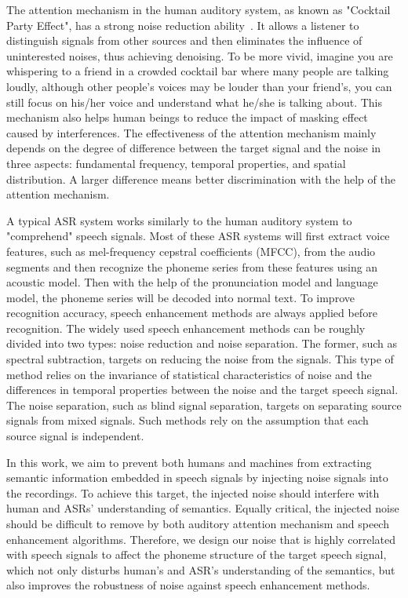 The attention mechanism in the human auditory system, as known as "Cocktail Party Effect", has a strong noise reduction ability~\cite{festen_effects_1990, leek_informational_1991,brungart_informational_2001, mattys_effects_2010}. It allows a listener to distinguish signals from other sources and then eliminates the influence of uninterested noises, thus achieving denoising. To be more vivid, imagine you are whispering to a friend in a crowded cocktail bar where many people are talking loudly, although other people's voices may be louder than your friend's, you can still focus on his/her voice and understand what he/she is talking about. This mechanism also helps human beings to reduce the impact of masking effect caused by interferences. The effectiveness of the attention mechanism mainly depends on the degree of difference between the target signal and the noise in three aspects: fundamental frequency, temporal properties, and spatial distribution. A larger difference means better discrimination with the help of the attention mechanism.

A typical ASR system works similarly to the human auditory system to "comprehend" speech signals. Most of these ASR systems will first extract voice features, such as mel-frequency cepstral coefficients (MFCC), from the audio segments and then recognize the phoneme series from these features using an acoustic model. Then with the help of the pronunciation model and language model, the phoneme series will be decoded into normal text. To improve recognition accuracy, speech enhancement methods are always applied before recognition. 
The widely used speech enhancement methods can be roughly divided into two types: noise reduction and noise separation. The former, such as spectral subtraction, targets on reducing the noise from the signals. This type of method relies on the invariance of statistical characteristics of noise and the differences in temporal properties between the noise and the target speech signal. The noise separation, such as blind signal separation, targets on separating source signals from mixed signals. Such methods rely on the assumption that each source signal is independent. 

In this work, we aim to prevent both humans and machines from extracting semantic information embedded in speech signals by injecting noise signals into the recordings. To achieve this target, the injected noise should interfere with human and ASRs' understanding of semantics. Equally critical, the injected noise should be difficult to remove by both auditory attention mechanism and speech enhancement algorithms. Therefore, we design our noise that is highly correlated with speech signals to affect the phoneme structure of the target speech signal, which not only disturbs human's and ASR's understanding of the semantics, but also improves the robustness of noise against speech enhancement methods.

